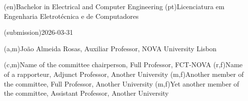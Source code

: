 \ntauthordegree(en){Bachelor in Electrical and Computer Engineering}
\ntauthordegree(pt){Licenciatura em Engenharia Eletrotécnica e de Computadores}

\ntdate(submission){2026-03-31}

(a,m){João Almeida Rosas, Auxiliar Professor, NOVA University Lisbon}

(c,m){Name of the committee chairperson, Full Professor, FCT-NOVA}
(r,f){Name of a rapporteur, Adjunct Professor, Another University}
(m,f){Another member of the committee, Full Professor, Another University}
(m,f){Yet another member of the committee, Assistant Professor, Another University}
